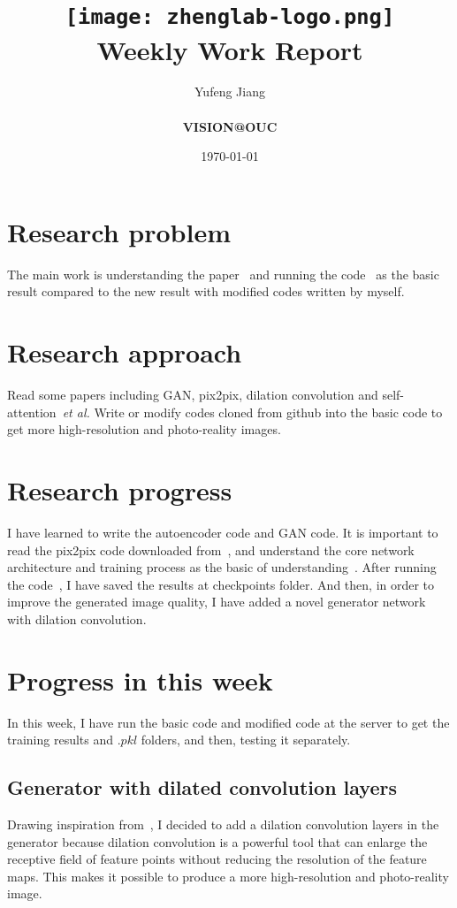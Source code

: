 \documentclass[a4paper]{article}
\title{
    \vspace*{1in}
    \texttt{[image: zhenglab-logo.png]}\\
    \vspace*{1.2in}
    \textbf{\huge Weekly Work Report}
    \vspace{0.2in}
}
\author{Yufeng Jiang \\
    \vspace*{0.5in} \\
    \textbf{VISION@OUC} \\
    \vspace*{1in}
}
\date{\today}
\begin{document}
\maketitle
\setcounter{page}{0}
\thispagestyle{empty}
\newpage
\section{Research problem}

The main work is understanding the paper~\cite{dis} and running the code~\cite{god} as the basic result compared to the new result with modified codes written by myself.

\section{Research approach}

Read some papers including GAN, pix2pix, dilation convolution and self-attention~\emph{et al.} Write or modify codes cloned from github into the basic code to get more high-resolution and photo-reality images. 

\section{Research progress}

I have learned to write the autoencoder code and GAN code. It is important to read the pix2pix code downloaded from~\cite{Git}, and understand the core network architecture and training process as the basic of understanding~\cite{god}. After running the code~\cite{god}, I have saved the results at checkpoints folder. And then, in order to improve the generated image quality, I have added a novel generator network with dilation convolution.

\section{Progress in this week}

In this week, I have run the basic code and modified code at the server to get the training results and $.pkl$ folders, and then, testing it separately.

\subsection{Generator with dilated convolution layers}

Drawing inspiration from~\cite{D}, I decided to add a dilation convolution layers in the generator because dilation convolution is a powerful tool that can enlarge the receptive field of feature points without reducing the resolution of the feature maps. This makes it possible to produce a more high-resolution and photo-reality image. 
\end{document}
